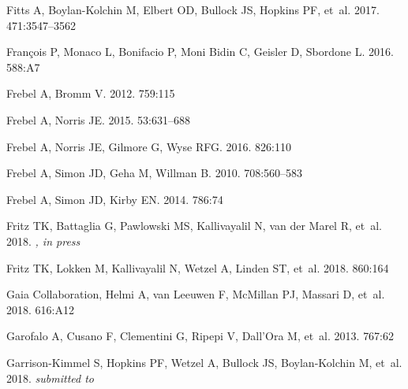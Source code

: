 \documentclass[a4paper]{ar-1col}
\begin{document}
\begin{thebibliography}{}
{Fitts} A, {Boylan-Kolchin} M, {Elbert} OD, {Bullock} JS, {Hopkins} PF, et~al.
  2017.
\textit{\mnras} 471:3547--3562

{Fran{\c c}ois} P, {Monaco} L, {Bonifacio} P, {Moni Bidin} C, {Geisler} D,
  {Sbordone} L. 2016.
\textit{\aap} 588:A7

{Frebel} A, {Bromm} V. 2012.
\textit{\apj} 759:115

{Frebel} A, {Norris} JE. 2015.
\textit{\araa} 53:631--688

{Frebel} A, {Norris} JE, {Gilmore} G, {Wyse} RFG. 2016.
\textit{\apj} 826:110

{Frebel} A, {Simon} JD, {Geha} M, {Willman} B. 2010.
\textit{\apj} 708:560--583

{Frebel} A, {Simon} JD, {Kirby} EN. 2014.
\textit{\apj} 786:74

{Fritz} TK, {Battaglia} G, {Pawlowski} MS, {Kallivayalil} N, {van der Marel} R,
  et~al. 2018{}.
\textit{\aap, in press}

{Fritz} TK, {Lokken} M, {Kallivayalil} N, {Wetzel} A, {Linden} ST, et~al.
  2018{}.
\textit{\apj} 860:164

{Gaia Collaboration}, {Helmi} A, {van Leeuwen} F, {McMillan} PJ, {Massari} D,
  et~al. 2018.
\textit{\aap} 616:A12

{Garofalo} A, {Cusano} F, {Clementini} G, {Ripepi} V, {Dall'Ora} M, et~al.
  2013.
\textit{\apj} 767:62

{Garrison-Kimmel} S, {Hopkins} PF, {Wetzel} A, {Bullock} JS, {Boylan-Kolchin}
  M, et~al. 2018.
\textit{submitted to \mnras}


\end{thebibliography}
\end{document}
